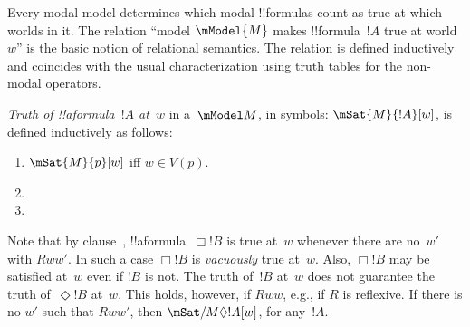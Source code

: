 \documentclass[../../../include/open-logic-section]{subfiles}
\begin{document}


Every modal model determines which modal !!{formula}s count as true at
which worlds in it. The relation ``model $\mModel{M}$ makes
!!{formula}~$!A$ true at world~$w$'' is the basic notion of relational
semantics. The relation is defined inductively and coincides with the
usual characterization using truth tables for the non-modal operators.

\begin{defn}
  \emph{Truth of !!a{formula}~$!A$ at~$w$} in a~$\mModel M$, in symbols:
  $\mSat{M}{!A}[w]$, is defined inductively as follows:
  \begin{enumerate}
  \item $\mSat{M}{p}[w]$ iff $w \in V(p)$.
  \item{}
  \item{}
  \end{enumerate}
\end{defn}

Note that by clause~, !!a{formula}~$\Box
!B$ is true at~$w$ whenever there are no~$w'$ with $Rww'$. In
such a case $\Box !B$ is \emph{vacuously} true at~$w$. Also,
$\Box !B$ may be satisfied at~$w$ even if $!B$ is not. The truth
of~$!B$ at~$w$ does not guarantee the truth of~$\Diamond !B$
at~$w$. This holds, however, if $Rww$, e.g., if $R$ is reflexive.  If
there is no $w'$ such that $Rww'$, then $\mSat/{M}{\Diamond !A}[w]$,
for any~$!A$.
\end{document}
